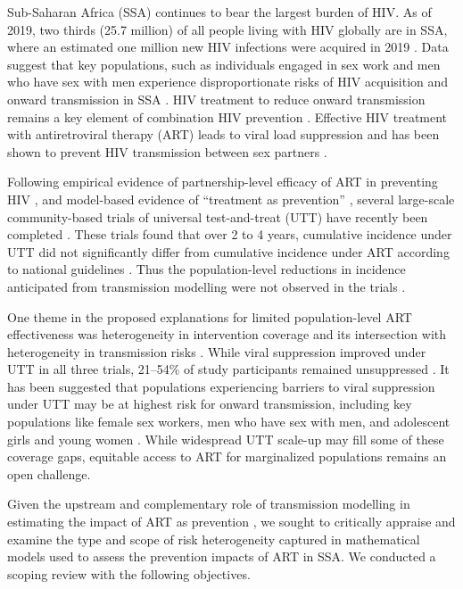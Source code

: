 Sub-Saharan Africa (SSA) continues to bear the largest burden of HIV.
As of 2019, two thirds (25.7 million) of all people living with HIV globally are in SSA, where
an estimated one million new HIV infections were acquired in 2019 \cite{AIDSinfo}.
Data suggest that key populations, such as individuals engaged in sex work and men who have sex with men experience
disproportionate risks of HIV acquisition and onward transmission in SSA
\cite{Baral2012,Beyrer2012,Mishra2012,Boily2015}.
HIV treatment to reduce onward transmission remains a key element of combination HIV prevention \cite{WHO2016ART}.
Effective HIV treatment with antiretroviral therapy (ART) leads to viral load suppression
and has been shown to prevent HIV transmission between sex partners \cite{Lundgren2015,Danel2015,Cohen2016}.
\par
Following empirical evidence of partnership-level efficacy of ART
in preventing HIV \cite{Lundgren2015,Danel2015,Cohen2016},
and model-based evidence of ``treatment as prevention'' \cite{Granich2009,Eaton2012,Cori2014},
several large-scale community-based trials of universal test-and-treat (UTT)
have recently been completed \cite{Iwuji2018,Havlir2019,Hayes2019}.
These trials found that over 2 to 4 years,
cumulative incidence under UTT did not significantly differ from
cumulative incidence under ART according to national guidelines \cite{Havlir2019,Hayes2019,Iwuji2018}.
Thus the population-level reductions in incidence anticipated from transmission modelling
were not observed in the trials \cite{Baral2019,Havlir2020}.
\par
One theme in the proposed explanations for limited population-level ART effectiveness
was heterogeneity in intervention coverage and its intersection with
heterogeneity in transmission risks \cite{AbdoolKarim2019,Baral2019}.
While viral suppression improved under UTT in all three trials,
21--54\% of study participants remained unsuppressed \cite{Iwuji2018,Havlir2019,Hayes2019}.
It has been suggested that populations experiencing barriers to viral suppression under UTT
may be at highest risk for onward transmission, including key populations like
female sex workers, men who have sex with men, and adolescent girls and young women
\cite{Hakim2018,Nyato2019,Green2020}.
While widespread UTT scale-up may fill some of these coverage gaps,
equitable access to ART for marginalized populations remains an open challenge.
\par
Given the upstream and complementary role of transmission modelling
in estimating the impact of ART as prevention \cite{Eaton2012,Delva2012},
we sought to critically appraise and examine the type and scope of risk heterogeneity captured
in mathematical models used to assess the prevention impacts of ART in SSA.
We conducted a scoping review with the following objectives.
